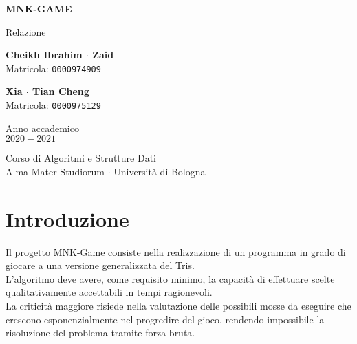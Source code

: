 \documentclass[11pt]{article}
\begin{document}
\begin{titlepage}
    \begin{center}
        \vspace*{1.5cm}
            
        \Huge
        \textbf{MNK-GAME}
            
        \vspace{0.5cm}
        \LARGE
        Relazione
            
        \vspace{1.5cm}
          
        \begin{minipage}[t]{0.47\textwidth}
        \begin{center}
        	{\large{\bf Cheikh Ibrahim $\cdot$ Zaid}}\\
			{\large Matricola: \texttt{0000974909}}
        \end{center}

		\end{minipage}
		\hfill
		\begin{minipage}[t]{0.47\textwidth}\raggedleft
		\begin{center}
        	{\large{\bf Xia $\cdot$ Tian Cheng}}\\
			{\large Matricola: \texttt{0000975129}}
        \end{center}
		\end{minipage}  
            
        \vspace{6cm}
            
        Anno accademico\\
        $2020 - 2021$
            
        \vspace{0.8cm}
            
            
        \Large
        Corso di Algoritmi e Strutture Dati\\
        Alma Mater Studiorum $\cdot$ Università di Bologna\\
            
    \end{center}
\end{titlepage}
\pagebreak


\section*{Introduzione}
\justify
Il progetto MNK-Game consiste nella realizzazione di un programma in grado di giocare a una versione generalizzata del Tris.\\
L'algoritmo deve avere, come requisito minimo, la capacità di effettuare scelte qualitativamente accettabili in tempi ragionevoli.\\
La criticità maggiore risiede nella valutazione delle possibili mosse da eseguire che crescono esponenzialmente nel progredire del gioco, rendendo impossibile la risoluzione del problema tramite forza bruta.
\end{document}
